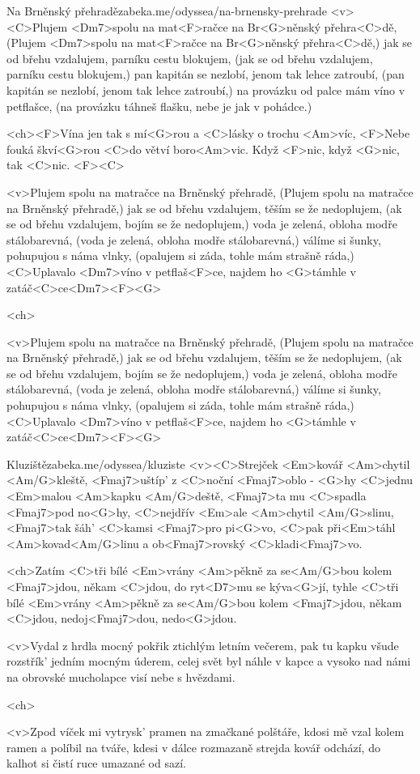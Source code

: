 \begin{song}{20}{Na Brněnský přehradě}{zabeka.me/odyssea/na-brnensky-prehrade}
	<v><C>Plujem <Dm7>spolu na mat<F>račce na Br<G>něnský přehra<C>dě,
	(Plujem <Dm7>spolu na mat<F>račce na Br<G>něnský přehra<C>dě,)
	jak se od břehu vzdalujem, parníku cestu blokujem,
	(jak se od břehu vzdalujem, parníku cestu blokujem,)
	pan kapitán se nezlobí, jenom tak lehce zatroubí,
	(pan kapitán se nezlobí, jenom tak lehce zatroubí,)
	na provázku od palce mám víno v petflašce,
	(na provázku táhneš flašku, nebe je jak v pohádce.)

	<ch><F>Vína jen tak s mí<G>rou a <C>lásky o trochu <Am>víc,
	<F>Nebe fouká škví<G>rou <C>do větví boro<Am>vic.
	Když <F>nic, když <G>nic, tak <C>nic. <F><C>

	<v>Plujem spolu na matračce na Brněnský přehradě,
	(Plujem spolu na matračce na Brněnský přehradě,)
	jak se od břehu vzdalujem, těším se že nedoplujem,
	(ak se od břehu vzdalujem, bojím se že nedoplujem,)
	voda je zelená, obloha modře stálobarevná,
	(voda je zelená, obloha modře stálobarevná,)
	válíme si šunky, pohupujou s náma vlnky,
	(opalujem si záda, tohle mám strašně ráda,)
	<C>Uplavalo <Dm7>víno v petflaš<F>ce, najdem ho <G>támhle v zatáč<C>ce<Dm7><F><G>

	<ch>

	<v>Plujem spolu na matračce na Brněnský přehradě,
	(Plujem spolu na matračce na Brněnský přehradě,)
	jak se od břehu vzdalujem, těším se že nedoplujem,
	(ak se od břehu vzdalujem, bojím se že nedoplujem,)
	voda je zelená, obloha modře stálobarevná,
	(voda je zelená, obloha modře stálobarevná,)
	válíme si šunky, pohupujou s náma vlnky,
	(opalujem si záda, tohle mám strašně ráda,)
	<C>Uplavalo <Dm7>víno v petflaš<F>ce, najdem ho <G>támhle v zatáč<C>ce<Dm7><F><G>
\end{song}
\begin{song}{21}{Kluziště}{zabeka.me/odyssea/kluziste}
	<v><C>Strejček <Em>kovář <Am>chytil <Am/G>kleště,
	<Fmaj7>uštíp' z <C>noční <Fmaj7>oblo - <G>hy
	<C>jednu <Em>malou <Am>kapku <Am/G>deště, <Fmaj7>ta mu <C>spadla <Fmaj7>pod no<G>hy,
	<C>nejdřív <Em>ale <Am>chytil <Am/G>slinu, <Fmaj7>tak šáh' <C>kamsi <Fmaj7>pro pi<G>vo,
	<C>pak při<Em>táhl <Am>kovad<Am/G>linu a ob<Fmaj7>rovský <C>kladi<Fmaj7>vo.

	<ch>Zatím <C>tři bílé <Em>vrány <Am>pěkně za se<Am/G>bou
	kolem <Fmaj7>jdou, někam <C>jdou, do ryt<D7>mu se kýva<G>jí,
	tyhle <C>tři bílé <Em>vrány <Am>pěkně za se<Am/G>bou
	kolem <Fmaj7>jdou, někam <C>jdou, nedoj<Fmaj7>dou, nedo<G>jdou.

	<v>Vydal z hrdla mocný pokřik ztichlým letním večerem,
	pak tu kapku všude rozstřík' jedním mocným úderem,
	celej svět byl náhle v kapce a vysoko nad námi
	na obrovské mucholapce visí nebe s hvězdami.

	<ch>

	<v>Zpod víček mi vytrysk' pramen na zmačkané polštáře,
	kdosi mě vzal kolem ramen a políbil na tváře,
	kdesi v dálce rozmazaně strejda kovář odchází,
	do kalhot si čistí ruce umazané od sazí.
\end{song}
